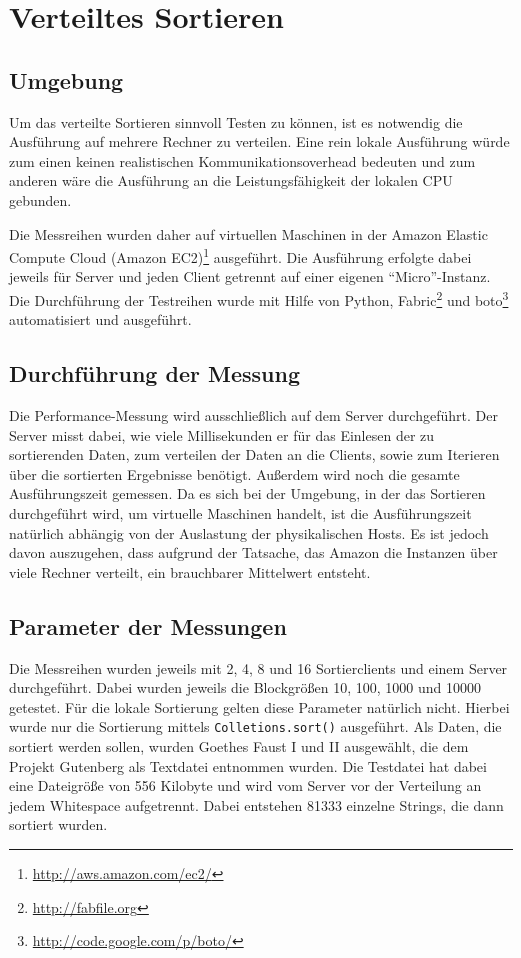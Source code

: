 \documentclass[fontsize=12pt,a4paper,headinclude=no,headings=small]{scrartcl}
\newcommand{\footurl}[1]{\footnote{\url{#1}}}
\begin{document}
\section{Verteiltes Sortieren}
\subsection{Umgebung}\label{sort:umgebung}
Um das verteilte Sortieren sinnvoll Testen zu können, ist es notwendig die Ausführung auf mehrere Rechner zu verteilen. Eine rein lokale Ausführung würde zum einen keinen realistischen Kommunikationsoverhead bedeuten und zum anderen wäre die Ausführung an die Leistungsfähigkeit der lokalen CPU gebunden.

Die Messreihen wurden daher auf virtuellen Maschinen in der Amazon Elastic Compute Cloud (Amazon EC2)\footurl{http://aws.amazon.com/ec2/} ausgeführt. Die Ausführung erfolgte dabei jeweils für Server und jeden Client getrennt auf einer eigenen "`Micro"'-Instanz. Die Durchführung der Testreihen wurde mit Hilfe von Python, Fabric\footurl{http://fabfile.org} und boto\footurl{http://code.google.com/p/boto/} automatisiert und ausgeführt.

\subsection{Durchführung der Messung}\label{sort:messung}
Die Performance-Messung wird ausschließlich auf dem Server durchgeführt. Der Server misst dabei, wie viele Millisekunden er für das Einlesen der zu sortierenden Daten, zum verteilen der Daten an die Clients, sowie zum Iterieren über die sortierten Ergebnisse benötigt. Außerdem wird noch die gesamte Ausführungszeit gemessen. Da es sich bei der Umgebung, in der das Sortieren durchgeführt wird, um virtuelle Maschinen handelt, ist die Ausführungszeit natürlich abhängig von der Auslastung der physikalischen Hosts. Es ist jedoch davon auszugehen, dass aufgrund der Tatsache, das Amazon die Instanzen über viele Rechner verteilt, ein brauchbarer Mittelwert entsteht.

\subsection{Parameter der Messungen}
Die Messreihen wurden jeweils mit 2, 4, 8 und 16 Sortierclients und einem Server durchgeführt. Dabei wurden jeweils die Blockgrößen 10, 100, 1000 und 10000 getestet. Für die lokale Sortierung gelten diese Parameter natürlich nicht. Hierbei wurde nur die Sortierung mittels \texttt{Colletions.sort()} ausgeführt. Als Daten, die sortiert werden sollen, wurden Goethes Faust I und II ausgewählt, die dem Projekt Gutenberg als Textdatei entnommen wurden. Die Testdatei hat dabei eine Dateigröße von 556 Kilobyte und wird vom Server vor der Verteilung an jedem Whitespace aufgetrennt. Dabei entstehen 81333 einzelne Strings, die dann sortiert wurden.
\end{document}
